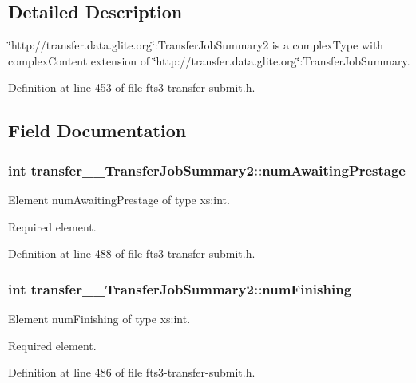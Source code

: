 \subsection{Detailed Description}
\char`\"{}http://transfer.data.glite.org\char`\"{}:TransferJobSummary2 is a complexType with complexContent extension of \char`\"{}http://transfer.data.glite.org\char`\"{}:TransferJobSummary. 

Definition at line 453 of file fts3-\/transfer-\/submit.h.



\subsection{Field Documentation}
\subsubsection[{numAwaitingPrestage}]{\setlength{\rightskip}{0pt plus 5cm}int {\bf transfer\_\-\_\-TransferJobSummary2::numAwaitingPrestage}}\label{classtransfer____TransferJobSummary2_a911d1b53f9f080a54792c9103492795e}


Element numAwaitingPrestage of type xs:int. 

Required element. 

Definition at line 488 of file fts3-\/transfer-\/submit.h.

\subsubsection[{numFinishing}]{\setlength{\rightskip}{0pt plus 5cm}int {\bf transfer\_\-\_\-TransferJobSummary2::numFinishing}}\label{classtransfer____TransferJobSummary2_a2f5afff6855a4741e7f124c80f367776}


Element numFinishing of type xs:int. 

Required element. 

Definition at line 486 of file fts3-\/transfer-\/submit.h.

